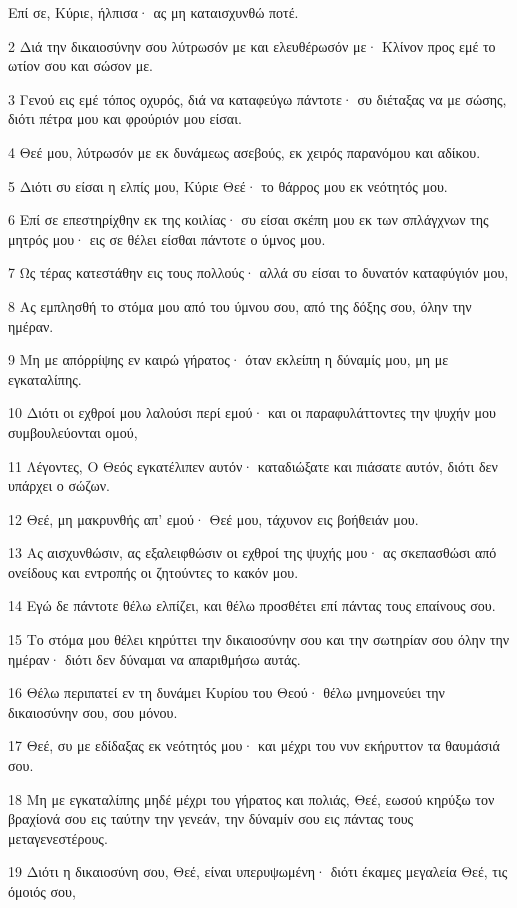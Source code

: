 \par Επί σε, Κύριε, ήλπισα· ας μη καταισχυνθώ ποτέ.
\par 2 Διά την δικαιοσύνην σου λύτρωσόν με και ελευθέρωσόν με· Κλίνον προς εμέ το ωτίον σου και σώσον με.
\par 3 Γενού εις εμέ τόπος οχυρός, διά να καταφεύγω πάντοτε· συ διέταξας να με σώσης, διότι πέτρα μου και φρούριόν μου είσαι.
\par 4 Θεέ μου, λύτρωσόν με εκ δυνάμεως ασεβούς, εκ χειρός παρανόμου και αδίκου.
\par 5 Διότι συ είσαι η ελπίς μου, Κύριε Θεέ· το θάρρος μου εκ νεότητός μου.
\par 6 Επί σε επεστηρίχθην εκ της κοιλίας· συ είσαι σκέπη μου εκ των σπλάγχνων της μητρός μου· εις σε θέλει είσθαι πάντοτε ο ύμνος μου.
\par 7 Ως τέρας κατεστάθην εις τους πολλούς· αλλά συ είσαι το δυνατόν καταφύγιόν μου,
\par 8 Ας εμπλησθή το στόμα μου από του ύμνου σου, από της δόξης σου, όλην την ημέραν.
\par 9 Μη με απόρρίψης εν καιρώ γήρατος· όταν εκλείπη η δύναμίς μου, μη με εγκαταλίπης.
\par 10 Διότι οι εχθροί μου λαλούσι περί εμού· και οι παραφυλάττοντες την ψυχήν μου συμβουλεύονται ομού,
\par 11 Λέγοντες, Ο Θεός εγκατέλιπεν αυτόν· καταδιώξατε και πιάσατε αυτόν, διότι δεν υπάρχει ο σώζων.
\par 12 Θεέ, μη μακρυνθής απ' εμού· Θεέ μου, τάχυνον εις βοήθειάν μου.
\par 13 Ας αισχυνθώσιν, ας εξαλειφθώσιν οι εχθροί της ψυχής μου· ας σκεπασθώσι από ονείδους και εντροπής οι ζητούντες το κακόν μου.
\par 14 Εγώ δε πάντοτε θέλω ελπίζει, και θέλω προσθέτει επί πάντας τους επαίνους σου.
\par 15 Το στόμα μου θέλει κηρύττει την δικαιοσύνην σου και την σωτηρίαν σου όλην την ημέραν· διότι δεν δύναμαι να απαριθμήσω αυτάς.
\par 16 Θέλω περιπατεί εν τη δυνάμει Κυρίου του Θεού· θέλω μνημονεύει την δικαιοσύνην σου, σου μόνου.
\par 17 Θεέ, συ με εδίδαξας εκ νεότητός μου· και μέχρι του νυν εκήρυττον τα θαυμάσιά σου.
\par 18 Μη με εγκαταλίπης μηδέ μέχρι του γήρατος και πολιάς, Θεέ, εωσού κηρύξω τον βραχίονά σου εις ταύτην την γενεάν, την δύναμίν σου εις πάντας τους μεταγενεστέρους.
\par 19 Διότι η δικαιοσύνη σου, Θεέ, είναι υπερυψωμένη· διότι έκαμες μεγαλεία Θεέ, τις όμοιός σου,
